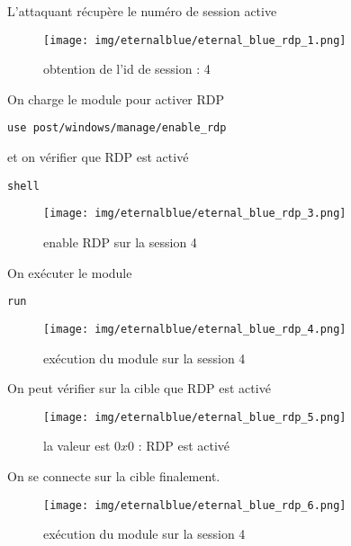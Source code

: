 \documentclass[a4paper,12pt]{report}
\begin{document}
L'attaquant récupère le numéro de session active 
 \begin{figure}[H] 
      \label{windows-rdp-session}
        \centering
          \texttt{[image: img/eternalblue/eternal\_blue\_rdp\_1.png]} 
        \caption{obtention de l'id de session : 4}
    \end{figure}


On charge le module  pour activer RDP

\begin{lstlisting}
use post/windows/manage/enable_rdp
\end{lstlisting}
 et on vérifier que RDP est activé

\begin{lstlisting}
shell
\end{lstlisting}
\begin{figure}[H] 
      \label{windows-rdp-enable}
        \centering
          \texttt{[image: img/eternalblue/eternal\_blue\_rdp\_3.png]} 
        \caption{enable RDP sur la session  4}
    \end{figure}


On exécuter le module
\begin{lstlisting}
run
\end{lstlisting}

\begin{figure}[H] 
      \label{windows-rdp-execution}
        \centering
          \texttt{[image: img/eternalblue/eternal\_blue\_rdp\_4.png]} 
        \caption{exécution du module sur la session  4}
    \end{figure}




On peut vérifier sur la cible que RDP est activé

\begin{figure}[H] 
      \label{windows-rdp-activé}
        \centering
          \texttt{[image: img/eternalblue/eternal\_blue\_rdp\_5.png]} 
        \caption{la valeur est $0x0$ : RDP est activé}
    \end{figure}



On se connecte sur la cible finalement.
\begin{figure}[H] 
      \label{windows-rdp-shell}
        \centering
          \texttt{[image: img/eternalblue/eternal\_blue\_rdp\_6.png]} 
        \caption{exécution du module sur la session  4}
    \end{figure}
\end{document}
